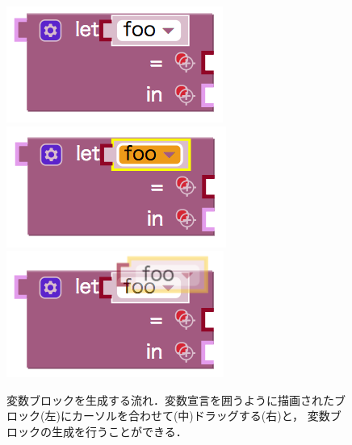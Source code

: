 \begin{figure}[h]
 \centering
 \includegraphics[keepaspectratio, scale=0.3]{img/boundFoo0.png}
 \includegraphics[keepaspectratio, scale=0.3]{img/boundFoo1.png}
 \includegraphics[keepaspectratio, scale=0.3]{img/boundFoo2.png}
 \caption{変数ブロックを生成する流れ．変数宣言を囲うように描画されたブロック(左)にカーソルを合わせて(中)ドラッグする(右)と，
変数ブロックの生成を行うことができる．\label{fig:boundFoo}}


\end{figure}
